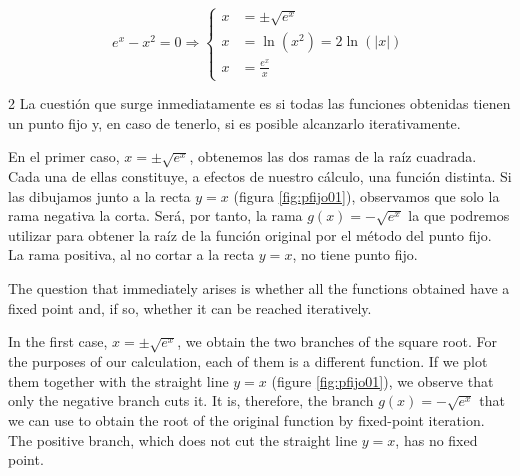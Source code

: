 \begin{equation*}
e^x-x^2=0 \Rightarrow \left\{
\begin{aligned}
x&=\pm  \sqrt{e^x}\\
x&= \ln(x^2)=2 \ln(\vert x \vert)\\
x&=\frac{e^x}{x}
\end{aligned}
\right.
\end{equation*}


\begin{paracol}{2}
La cuestión que surge inmediatamente es si todas las funciones obtenidas tienen un punto fijo y, en caso de tenerlo, si es posible alcanzarlo iterativamente.

En el primer caso, $x=\pm \sqrt{e^x}$, obtenemos las dos ramas de la raíz cuadrada. Cada una de ellas constituye, a efectos de nuestro cálculo, una función distinta. Si las dibujamos junto a la recta $y=x$ (figura \ref{fig:pfijo01}), observamos que solo la rama negativa la corta. Será, por tanto, la rama $g(x)=-\sqrt{e^x}$ la que podremos utilizar para obtener la raíz de la función original por el método del punto fijo. La rama positiva, al no cortar a la recta $y=x$, no tiene punto fijo.

\switchcolumn

The question that immediately arises is whether all the functions obtained have a fixed point and, if so, whether it can be reached iteratively.

In the first case, $x=\pm \sqrt{e^x}$, we obtain the two branches of the square root. For the purposes of our calculation, each of them is a different function. If we plot them together with the straight line $y=x$ (figure \ref{fig:pfijo01}), we observe that only the negative branch cuts it. It is, therefore, the branch $g(x)=-\sqrt{e^x}$ that we can use to obtain the root of the original function by fixed-point iteration. The positive branch, which does not cut the straight line $y=x$, has no fixed point.
\end{paracol}

